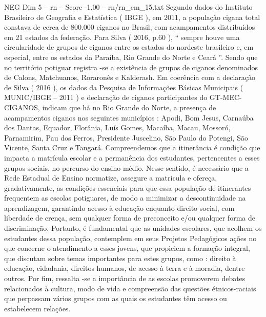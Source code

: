 \begin{textsample}{NEG Dim 5 – rn – Score -1.00 – rn/rn\_em\_15.txt}
Segundo dados do Instituto Brasileiro de Geografia e Estatística ( IBGE ), em 2011, a população cigana total constava de cerca de 800.000 ciganos no Brasil, com acampamentos distribuídos em 21 estados da federação.
Para Silva ( 2016, p.60 ), “ sempre houve uma circularidade de grupos de ciganos entre os estados do nordeste brasileiro e, em especial, entre os estados da Paraíba, Rio Grande do Norte e Ceará ”.
Sendo que no território potiguar registra -se a existência de grupos de ciganos denominados de Calons, Matchuanos, Roraronês e Kalderash.
Em coerência com a declaração de Silva ( 2016 ), os dados da Pesquisa de Informações Básicas Municipais ( MUNIC/IBGE – 2011 ) e declaração de ciganos participantes do GT-MEC-CIGANOS, indicam que há no Rio Grande do Norte, a presença de acampamentos ciganos nos seguintes municípios : Apodi, Bom Jesus, Carnaúba dos Dantas, Equador, Florânia, Luís Gomes, Macaíba, Macau, Mossoró, Parnamirim, Pau dos Ferros, Presidente Juscelino, São Paulo do Potengi, São Vicente, Santa Cruz e Tangará.
Compreendemos que a itinerância é condição que impacta a matrícula escolar e a permanência dos estudantes, pertencentes a esses grupos sociais, no percurso do ensino médio.
Nesse sentido, é necessário que a Rede Estadual de Ensino normatize, assegure a matrícula e ofereça, gradativamente, as condições essenciais para que essa população de itinerantes frequentem as escolas potiguares, de modo a minimizar a descontinuidade na aprendizagem, garantindo acesso à educação enquanto direito social, com liberdade de crença, sem qualquer forma de preconceito e/ou qualquer forma de discriminação.
Portanto, é fundamental que as unidades escolares, que acolhem os estudantes dessa população, contemplem em seus Projetos Pedagógicos ações no que concerne o atendimento a esses jovens, que propiciem a formação integral, que discutam sobre temas importantes para estes grupos, como : direito à educação, cidadania, direitos humanos, de acesso à terra e à moradia, dentre outros.
Por fim, ressalta -se a importância de as escolas promoverem debates relacionados à cultura, modo de vida e compreensão das questões étnicos-raciais que perpassam vários grupos com as quais os estudantes têm acesso ou estabelecem relações.

\end{textsample}
